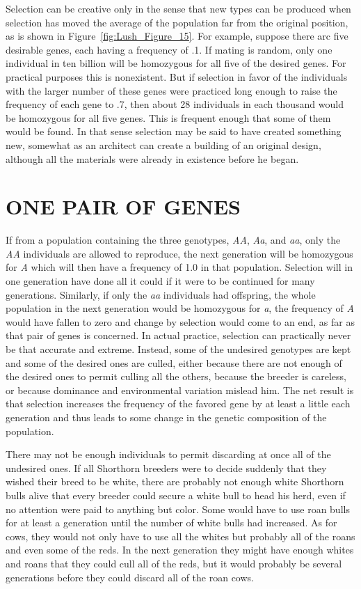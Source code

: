 Selection can be creative only in the sense that new types can be
produced when selection has moved the average of the population far
from the original position, as is shown in Figure~\ref{fig:Lush_Figure_15}. For example, suppose
there arc five desirable genes, each having a frequency of .1. If
mating is random, only one individual in ten billion will be homozygous
for all five of the desired genes. For practical purposes this is nonexistent.
But if selection in favor of the individuals with the larger
number of these genes were practiced long enough to raise the frequency
of each gene to .7, then about 28 individuals in each thousand would
be homozygous for all five genes. This is frequent enough that some of
them would be found. In that sense selection may be said to have created
something new, somewhat as an architect can create a building of
an original design, although all the materials were already in existence
before he began.

\section*{ONE PAIR OF GENES}

If from a population containing the three genotypes, \textit{AA}, \textit{Aa}, and
\textit{aa}, only the \textit{AA} individuals are allowed to reproduce, the next
generation will be homozygous for \textit{A} which will then have a frequency of 1.0
in that population. Selection will in one generation have done all it
could if it were to be continued for many generations. Similarly, if only
the \textit{aa} individuals had offspring, the whole population in the next generation
would be homozygous for \textit{a}, the frequency of \textit{A} would have
fallen to zero and change by selection would come to an end, as far as
that pair of genes is concerned. In actual practice, selection can practically
never be that accurate and extreme. Instead, some of the undesired
genotypes are kept and some of the desired ones are culled, either
because there are not enough of the desired ones to permit culling all
the others, because the breeder is careless, or because dominance and
environmental variation mislead him. The net result is that selection
increases the frequency of the favored gene by at least a little each generation
and thus leads to some change in the genetic composition of the
population.

There may not be enough individuals to permit discarding at once
all of the undesired ones. If all Shorthorn breeders were to decide suddenly
that they wished their breed to be white, there are probably not
enough white Shorthorn bulls alive that every breeder could secure a
white bull to head his herd, even if no attention were paid to anything
but color. Some would have to use roan bulls for at least a generation
until the number of white bulls had increased. As for cows, they would
not only have to use all the whites but probably all of the roans and
even some of the reds. In the next generation they might have enough
whites and roans that they could cull all of the reds, but it would
probably be several generations before they could discard all of the roan
cows.

